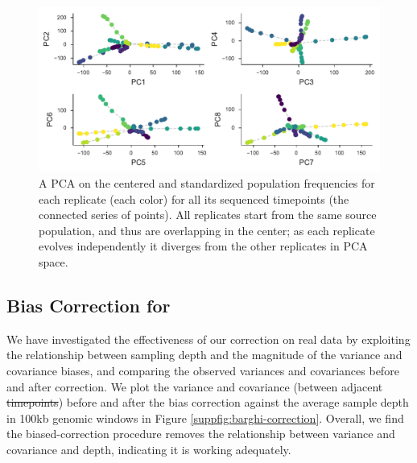 \documentclass[11pt]{article}
\providecommand{\DIFaddtex}[1]{{\protect\color{blue}\uwave{#1}}} %
\providecommand{\DIFdeltex}[1]{{\protect\color{red}\sout{#1}}}                      %
\providecommand{\DIFaddbegin}{} %
\providecommand{\DIFaddend}{} %
\providecommand{\DIFdelbegin}{} %
\providecommand{\DIFdelend}{} %
\providecommand{\DIFadd}[1]{\texorpdfstring{\DIFaddtex{#1}}{#1}} %
\providecommand{\DIFdel}[1]{\texorpdfstring{\DIFdeltex{#1}}{}} %
\begin{document}
\begin{figure}[!ht]
  \centering

  \includegraphics[]{figures/barghi-panel-pca.pdf}

  \caption{A PCA on the centered and standardized population frequencies for
  each replicate (each color) for all its sequenced timepoints (the connected
  series of points). All replicates start from the same source population, and
  thus are overlapping in the center; as each replicate evolves independently it
  diverges from the other replicates in PCA space.}

  \label{suppfig:barghi-pca}
\end{figure}

\DIFaddbegin \clearpage

\DIFaddend \subsection{Bias Correction for \textcite{Barghi2019-qy}}

We have investigated the effectiveness of our correction on real data by
exploiting the relationship between sampling depth and the magnitude of the
variance and covariance biases, and comparing the observed variances and
covariances before and after correction. We plot the variance and covariance
(between adjacent \DIFdelbegin \DIFdel{timepoints}\DIFdelend \DIFaddbegin \DIFadd{time intervals}\DIFaddend ) before and after the bias correction against
the average sample depth in 100kb genomic windows in Figure
\ref{suppfig:barghi-correction}. Overall, we find the biased-correction
procedure removes the relationship between variance and covariance and depth,
indicating it is working adequately.
\end{document}
